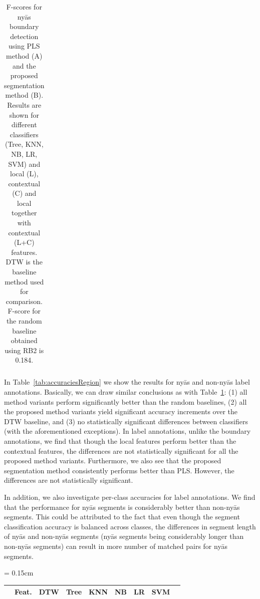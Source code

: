 {\begin{table}
\begin{tabular}{ c|c|c| c c c c c c }
	\end{tabular}
	
	\caption{F-scores for ny\={a}s boundary detection using PLS method (A) and the proposed segmentation method (B). Results are shown for different classifiers (Tree, KNN, NB, LR, SVM) and local (L), contextual (C) and local together with contextual (L+C) features. DTW is the baseline method used for comparison. F-score for the random baseline obtained using RB2 is 0.184. }
	\label{tab:accuraciesboundary}
\end{table}

In Table~\ref{tab:accuraciesRegion} we show the results for ny\={a}s and non-ny\={a}s label annotations. Basically, we can draw similar conclusions as with Table~\ref{tab:accuraciesboundary}: (1) all method variants perform significantly better than the random baselines, (2) all the proposed method variants yield significant accuracy increments over the DTW baseline, and (3) no statistically significant differences between classifiers (with the aforementioned exceptions). In label annotations, unlike the boundary annotations, we find that though the local features perform better than the contextual features, the differences are not statistically significant for all the proposed method variants. Furthermore, we also see that the proposed segmentation method consistently performs  better than PLS. However, the differences are not statistically significant.

In addition, we also investigate per-class accuracies for label annotations. We find that the performance for ny\={a}s segments is considerably better than non-ny\={a}s segments. This could be attributed to the fact that even though the segment classification accuracy is balanced across classes, the differences in segment length of ny\={a}s and non-ny\={a}s segments (ny\={a}s segments being considerably longer than non-ny\={a}s segments) can result in more number of matched pairs for ny\={a}s segments.

\begin{table} 
	\centering
	\tabcolsep = 0.15cm
	\renewcommand{\arraystretch}{1.15}
	\begin{tabular}{ c|c|c | c  c  c  c  c  c }
		\hline\hline
		& Feat.	&	DTW & Tree	 &	KNN 	&	NB		& LR 	&	SVM	\\
		\hline
		

\end{tabular}
\end{table}}
